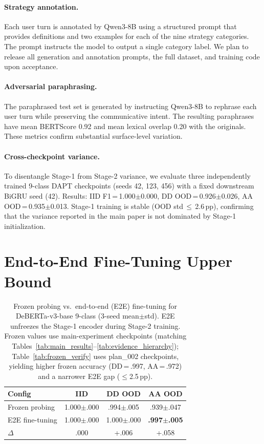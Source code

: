\paragraph{Strategy annotation.}
Each user turn is annotated by Qwen3-8B using a structured prompt that provides definitions and two examples for each of the nine strategy categories. The prompt instructs the model to output a single category label. We plan to release all generation and annotation prompts, the full dataset, and training code upon acceptance.

\paragraph{Adversarial paraphrasing.}
The paraphrased test set is generated by instructing Qwen3-8B to rephrase each user turn while preserving the communicative intent. The resulting paraphrases have mean BERTScore 0.92 and mean lexical overlap 0.20 with the originals. These metrics confirm substantial surface-level variation.

\paragraph{Cross-checkpoint variance.}
To disentangle Stage-1 from Stage-2 variance, we evaluate three independently trained 9-class DAPT checkpoints (seeds 42, 123, 456) with a fixed downstream BiGRU seed (42). Results: IID F1\,=\,1.000$\pm$0.000, DD OOD\,=\,0.926$\pm$0.026, AA OOD\,=\,0.935$\pm$0.013. Stage-1 training is stable (OOD std\,$\leq$\,2.6\,pp), confirming that the variance reported in the main paper is not dominated by Stage-1 initialization.

\section{End-to-End Fine-Tuning Upper Bound}
\label{app:e2e}

\begin{table}[ht]
\centering
\footnotesize
\caption{Frozen probing vs.\ end-to-end (E2E) fine-tuning for DeBERTa-v3-base 9-class (3-seed mean$\pm$std). E2E unfreezes the Stage-1 encoder during Stage-2 training. Frozen values use main-experiment checkpoints (matching Tables~\ref{tab:main_results}--\ref{tab:evidence_hierarchy}); Table~\ref{tab:frozen_verify} uses plan\_002 checkpoints, yielding higher frozen accuracy (DD\,=\,.997, AA\,=\,.972) and a narrower E2E gap ($\leq$2.5\,pp).}
\label{tab:e2e}
\begin{tabular}{@{}lccc@{}}
\toprule
\textbf{Config} & IID & DD OOD & AA OOD \\
\midrule
Frozen probing & 1.000$\pm$.000 & .994$\pm$.005 & .939$\pm$.047 \\
E2E fine-tuning & 1.000$\pm$.000 & 1.000$\pm$.000 & \textbf{.997$\pm$.005} \\
\midrule
$\Delta$ & .000 & +.006 & +.058 \\
\bottomrule
\end{tabular}
\end{table}

